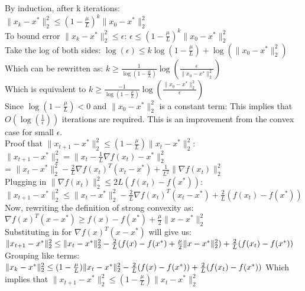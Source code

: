 \begin{Parts}
\begin{solution}
     By induction, after k iterations: \\
     $\|x_{k}-x^*\|_2^2 \leq (1 - \frac{\mu}{L})^k\|x_{0} - x^* \|_2^2$ \\
     To bound error $\|x_{k}-x^*\|_2^2 \leq \epsilon$: $\epsilon \leq (1 - \frac{\mu}{L})^k\|x_{0} - x^* \|_2^2$ \\
     Take the log of both sides: $\log(\epsilon) \leq k \log(1 - \frac{\mu}{L}) + \log(\|x_{0} - x^* \|_2^2)$ \\
     Which can be rewritten as: $k \geq \frac{1}{\log(1- \frac{\mu}{L})} \log(\frac{\epsilon}{\|x_{0} - x^* \|_2^2})$ \\
     Which is equivalent to $k \geq \frac{-1}{\log(1- \frac{\mu}{L})} \log(\frac{\|x_{0} - x^* \|_2^2}{\epsilon})$ \\
     Since $\log(1 - \frac{\mu}{L}) < 0$ and $\|x_{0} - x^* \|_2^2$ is a constant term:  
     This implies that $O(\log(\frac{1}{\epsilon}))$ iterations are required. This is an improvement from the convex case for small $\epsilon$. \\


     Proof that $\|x_{t+1}-x^*\|_2^2 \leq (1 - \frac{\mu}{L})\|x_{t} - x^* \|_2^2$: \\
      $\|x_{t+1}-x^*\|_2^2 = \|x_{t} - \frac{1}{L} \nabla f(x_t) -x^*\|_2^2$ \\
      =  $\|x_{t} - x^* \|_2^2 - \frac{2}{L} \nabla f(x_t)^T(x_t - x^*) + \frac{1}{L^2}  \|\nabla f(x_t) \|_2^2 $ \\
      Plugging in  $\| \nabla f(x_t) \|_2^2 \leq 2L (f(x_t) - f(x^*))$: \\
      $\|x_{t+1}-x^*\|_2^2 \leq  \|x_{t} - x^* \|_2^2 - \frac{2}{L} \nabla f(x_t)^T(x_t - x^*) + \frac{2}{L} (f(x_t) - f(x^*)) $ \\
      Now, rewriting the definition of strong convexity as: \\
      $\nabla f(x)^T(x-x^*) \geq f(x) - f(x^*) + \frac{\mu}{2} \|x-x^*\|_2^2$   \\
      Substituting in for $\nabla f(x)^T(x-x^*) $ will give us: \\
      $\|x_{t+1}-x^*\|_2^2 \leq  \|x_{t} - x^* \|_2^2 - \frac{2}{L} (f(x) - f(x^*) + \frac{\mu}{2} \|x-x^*\|_2^2) + \frac{2}{L} (f(x_t) - f(x^*)) \\ $
      Grouping like terms: \\
     $\|x_{k}-x^*\|_2^2  \leq  (1 - \frac{\mu}{L})\|x_{t} - x^* \|_2^2 - \frac{2}{L} (f(x) - f(x^*)) + \frac{2}{L} (f(x_t) - f(x^*)) \\ $
     Which implies that $\|x_{t+1}-x^*\|_2^2 \leq (1 - \frac{\mu}{L})\|x_{t} - x^* \|_2^2$ \\ \\




\end{solution}
\end{Parts}

